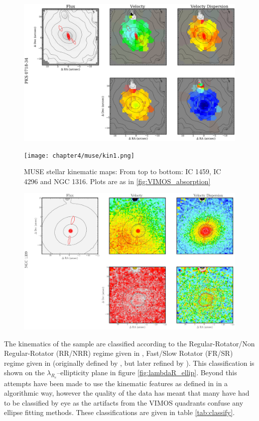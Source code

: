 		\begin{figure}
			\centering
			\includegraphics[height=0.31\textheight]{chapter4/vimos/kin4.png}
		\end{figure}


		\begin{figure}
			\centering
			\texttt{[image: chapter4/muse/kin1.png]}
			\caption[MUSE stellar kinematic maps]{MUSE stellar kinematic maps: From top to bottom: IC 1459, IC 4296 and NGC 1316. Plots are as in \ref{fig:VIMOS_absorption}}
			\label{fig:VIMOS_stellar}
		\end{figure}
		\begin{figure}
			\centering
			\includegraphics[height=0.31\textheight]{chapter4/muse/kin2.png}
		\end{figure}

		
		The kinematics of the sample are classified according to the Regular-Rotator/Non Regular-Rotator (RR/NRR) regime given in \citet{Krajnovic2011}, Fast/Slow Rotator (FR/SR) regime given in \citet{Cappellari2016} (originally defined by \citet{Emsellem2011}, but later refined by \citet{Cappellari2016}). This classification is shown on the $\lambda_{R_e}$--ellipticity plane in figure \ref{fig:lambdaR_ellip}. Beyond this attempts have been made to use the kinematic features as defined in \citet{Krajnovic2011} in a algorithmic way, however the quality of the data has meant that many have had to be classified by eye as the artifacts from the VIMOS quadrants confuse any ellipse fitting methods. These classifications are given in table \ref{tab:classify}. 



